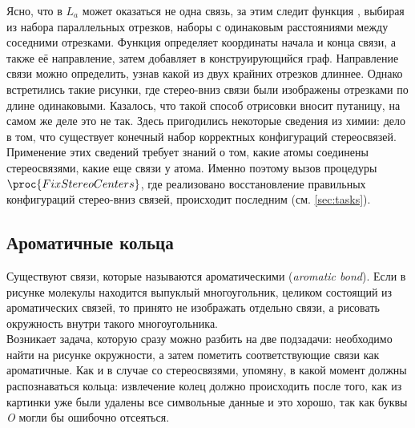 \noindent
Ясно, что в $L_{a}$ может оказаться не одна связь, за этим следит функция , выбирая
из набора параллельных отрезков, наборы с одинаковым расстояниями между соседними отрезками. Функция  определяет
координаты начала и конца связи, а также её направление, затем добавляет в конструирующийся граф. Направление связи можно определить, узнав
какой из двух крайних отрезков длиннее. Однако встретились такие рисунки, где стерео-вниз связи были изображены отрезками по длине одинаковыми.
Казалось, что такой способ отрисовки вносит путаницу, на самом же деле это не так. Здесь пригодились некоторые сведения из химии: дело в том, что
существует конечный набор корректных конфигураций стереосвязей. Применение этих сведений требует знаний о том, какие атомы соединены стереосвязями,
какие еще связи у атома. Именно поэтому вызов процедуры $\proc{FixStereoCenters}$, где реализовано восстановление правильных конфигураций стерео-вниз
связей, происходит последним (см. \ref{sec:tasks}). 

\subsection{Ароматичные кольца}
\label{subsec:rings}

Существуют связи, которые называются ароматическими (\emph{aromatic bond}). Если в рисунке молекулы находится выпуклый 
многоугольник, целиком состоящий из ароматических связей, то принято не изображать отдельно связи, а рисовать окружность внутри такого многоугольника.\\

\noindent
Возникает задача, которую сразу можно разбить на две подзадачи: необходимо найти на рисунке окружности, а затем пометить соответствующие связи
как ароматичные. Как и в случае со стереосвязями, упомяну, в какой момент должны распознаваться кольца: извлечение колец должно происходить после того, 
как из картинки уже были удалены все символьные данные и это хорошо, так как буквы \emph{O} могли бы ошибочно отсеяться.  

